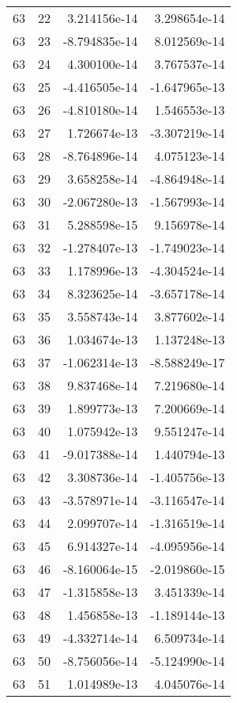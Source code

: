 \begin{tabular}{rrrr}
  63 &   22 &  3.214156e-14 &  3.298654e-14 \\
  63 &   23 & -8.794835e-14 &  8.012569e-14 \\
  63 &   24 &  4.300100e-14 &  3.767537e-14 \\
  63 &   25 & -4.416505e-14 & -1.647965e-13 \\
  63 &   26 & -4.810180e-14 &  1.546553e-13 \\
  63 &   27 &  1.726674e-13 & -3.307219e-14 \\
  63 &   28 & -8.764896e-14 &  4.075123e-14 \\
  63 &   29 &  3.658258e-14 & -4.864948e-14 \\
  63 &   30 & -2.067280e-13 & -1.567993e-14 \\
  63 &   31 &  5.288598e-15 &  9.156978e-14 \\
  63 &   32 & -1.278407e-13 & -1.749023e-14 \\
  63 &   33 &  1.178996e-13 & -4.304524e-14 \\
  63 &   34 &  8.323625e-14 & -3.657178e-14 \\
  63 &   35 &  3.558743e-14 &  3.877602e-14 \\
  63 &   36 &  1.034674e-13 &  1.137248e-13 \\
  63 &   37 & -1.062314e-13 & -8.588249e-17 \\
  63 &   38 &  9.837468e-14 &  7.219680e-14 \\
  63 &   39 &  1.899773e-13 &  7.200669e-14 \\
  63 &   40 &  1.075942e-13 &  9.551247e-14 \\
  63 &   41 & -9.017388e-14 &  1.440794e-13 \\
  63 &   42 &  3.308736e-14 & -1.405756e-13 \\
  63 &   43 & -3.578971e-14 & -3.116547e-14 \\
  63 &   44 &  2.099707e-14 & -1.316519e-14 \\
  63 &   45 &  6.914327e-14 & -4.095956e-14 \\
  63 &   46 & -8.160064e-15 & -2.019860e-15 \\
  63 &   47 & -1.315858e-13 &  3.451339e-14 \\
  63 &   48 &  1.456858e-13 & -1.189144e-13 \\
  63 &   49 & -4.332714e-14 &  6.509734e-14 \\
  63 &   50 & -8.756056e-14 & -5.124990e-14 \\
  63 &   51 &  1.014989e-13 &  4.045076e-14 \\

\end{tabular}
